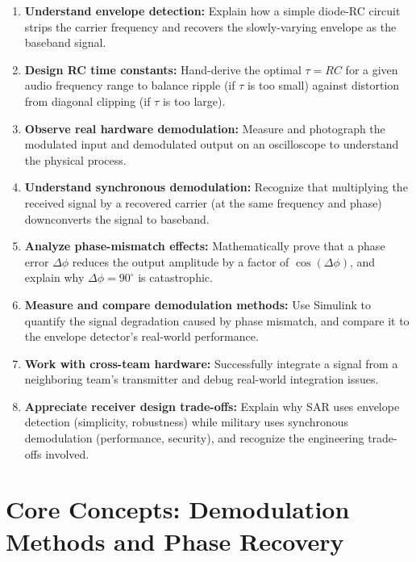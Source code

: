 \documentclass[11pt,letterpaper]{article}
\begin{document}
\begin{enumerate}
    \item \textbf{Understand envelope detection:} Explain how a simple diode-RC circuit strips the carrier frequency and recovers the slowly-varying envelope as the baseband signal.

    \item \textbf{Design RC time constants:} Hand-derive the optimal $\tau = RC$ for a given audio frequency range to balance ripple (if $\tau$ is too small) against distortion from diagonal clipping (if $\tau$ is too large).

    \item \textbf{Observe real hardware demodulation:} Measure and photograph the modulated input and demodulated output on an oscilloscope to understand the physical process.

    \item \textbf{Understand synchronous demodulation:} Recognize that multiplying the received signal by a recovered carrier (at the same frequency and phase) downconverts the signal to baseband.

    \item \textbf{Analyze phase-mismatch effects:} Mathematically prove that a phase error $\Delta \phi$ reduces the output amplitude by a factor of $\cos(\Delta \phi)$, and explain why $\Delta \phi = 90^\circ$ is catastrophic.

    \item \textbf{Measure and compare demodulation methods:} Use Simulink to quantify the signal degradation caused by phase mismatch, and compare it to the envelope detector's real-world performance.

    \item \textbf{Work with cross-team hardware:} Successfully integrate a signal from a neighboring team's transmitter and debug real-world integration issues.

    \item \textbf{Appreciate receiver design trade-offs:} Explain why SAR uses envelope detection (simplicity, robustness) while military uses synchronous demodulation (performance, security), and recognize the engineering trade-offs involved.
\end{enumerate}

\clearpage

\section{Core Concepts: Demodulation Methods and Phase Recovery}
\label{sec:concepts}
\end{document}
